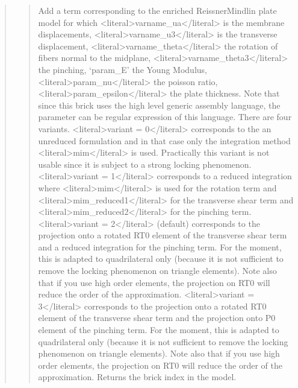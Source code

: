 \documentclass[a4paper,11pt,english]{sphinxmanual}
\begin{document}
\begin{quote}
\begin{quote}
\sphinxAtStartPar
Add a term corresponding to the enriched Reissner\sphinxhyphen{}Mindlin plate
model for which \textless{}literal\textgreater{}varname\_ua\textless{}/literal\textgreater{} is the membrane displacements,
\textless{}literal\textgreater{}varname\_u3\textless{}/literal\textgreater{} is the transverse displacement,
\textless{}literal\textgreater{}varname\_theta\textless{}/literal\textgreater{} the rotation of
fibers normal to the midplane,
\textless{}literal\textgreater{}varname\_theta3\textless{}/literal\textgreater{} the pinching,
‘param\_E’ the Young Modulus,
\textless{}literal\textgreater{}param\_nu\textless{}/literal\textgreater{} the poisson ratio,
\textless{}literal\textgreater{}param\_epsilon\textless{}/literal\textgreater{} the plate thickness. Note that since this brick
uses the high level generic assembly language, the parameter can
be regular expression of this language.
There are four variants.
\textless{}literal\textgreater{}variant = 0\textless{}/literal\textgreater{} corresponds to the an
unreduced formulation and in that case only the integration
method \textless{}literal\textgreater{}mim\textless{}/literal\textgreater{} is used. Practically this variant is not usable since
it is subject to a strong locking phenomenon.
\textless{}literal\textgreater{}variant = 1\textless{}/literal\textgreater{} corresponds to a reduced integration where \textless{}literal\textgreater{}mim\textless{}/literal\textgreater{} is
used for the rotation term and \textless{}literal\textgreater{}mim\_reduced1\textless{}/literal\textgreater{} for the transverse
shear term and \textless{}literal\textgreater{}mim\_reduced2\textless{}/literal\textgreater{} for the pinching term.
\textless{}literal\textgreater{}variant = 2\textless{}/literal\textgreater{} (default) corresponds to the projection onto
a rotated RT0 element of the transverse shear term and a reduced integration for the pinching term.
For the moment, this is adapted to quadrilateral only (because it is not sufficient to
remove the locking phenomenon on triangle elements). Note also that if
you use high order elements, the projection on RT0 will reduce the order
of the approximation.
\textless{}literal\textgreater{}variant = 3\textless{}/literal\textgreater{} corresponds to the projection onto
a rotated RT0 element of the transverse shear term and the projection onto P0 element of the pinching term.
For the moment, this is adapted to quadrilateral only (because it is not sufficient to
remove the locking phenomenon on triangle elements). Note also that if
you use high order elements, the projection on RT0 will reduce the order
of the approximation.
Returns the brick index in the model.
\end{quote}


\end{quote}
\end{document}
